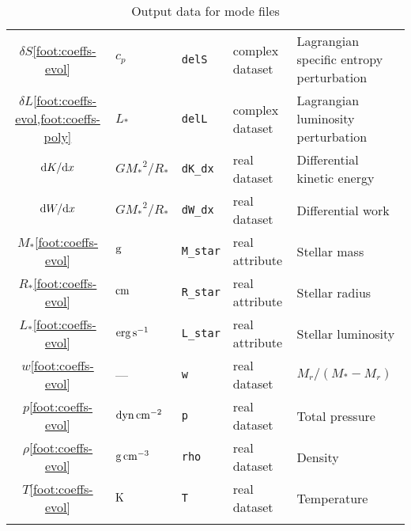 \documentclass{article}
\newcommand{\diff}{\ensuremath{{\rm d}}}
\newcommand{\Rstar}{\ensuremath{R_{\ast}}}
\newcommand{\Mstar}{\ensuremath{M_{\ast}}}
\newcommand{\Lstar}{\ensuremath{L_{\ast}}}
\newcommand{\cm}{\ensuremath{{\rm cm}}}
\newcommand{\gram}{\ensuremath{{\rm g}}}
\newcommand{\second}{\ensuremath{{\rm s}}}
\newcommand{\dyne}{\ensuremath{{\rm dyn}}}
\newcommand{\erg}{\ensuremath{{\rm erg}}}
\newcommand{\kelvin}{\ensuremath{{\rm K}}}
\begin{document}
\begin{center}
\begin{longtable}{cllll}
$\delta S$\cref{foot:coeffs-evol} & $c_{p}$ & \texttt{delS} & complex dataset & Lagrangian specific entropy perturbation \\
$\delta L$\cref{foot:coeffs-evol,foot:coeffs-poly} & \Lstar & \texttt{delL} & complex dataset & Lagrangian luminosity perturbation \\
$\diff K/\diff x$ & $G\Mstar^{2}/\Rstar$ & \texttt{dK\_dx} & real dataset & Differential kinetic energy \\
$\diff W/\diff x$ & $G\Mstar^{2}/\Rstar$ & \texttt{dW\_dx} & real dataset & Differential work \\ 
\Mstar\cref{foot:coeffs-evol} & \gram & \texttt{M\_star} & real attribute & Stellar mass \\
\Rstar\cref{foot:coeffs-evol} & \cm & \texttt{R\_star} & real attribute & Stellar radius \\
\Lstar\cref{foot:coeffs-evol} & $\erg\,\second^{-1}$ & \texttt{L\_star} & real attribute & Stellar luminosity \\
$w$\cref{foot:coeffs-evol} & --- & \texttt{w} & real dataset & $M_{r}/(\Mstar-M_{r})$ \\
$p$\cref{foot:coeffs-evol} & $\dyne\,\cm^{-2}$ & \texttt{p} & real dataset & Total pressure \\
$\rho$\cref{foot:coeffs-evol} & $\gram\,\cm^{-3}$ & \texttt{rho} & real dataset & Density \\
$T$\cref{foot:coeffs-evol} & $\kelvin$ & \texttt{T} & real dataset & Temperature \\ \hline
\caption{Output data for mode files}
\end{longtable}
\end{center}



\end{document}
